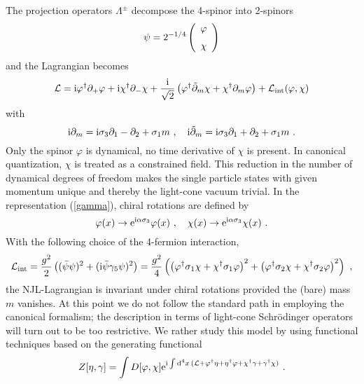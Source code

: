 \documentclass[a4paper,12pt]{article}
\begin{document}
The projection operators  $\Lambda^{\pm}$ decompose the 4-spinor into 2-spinors
\begin{displaymath}
\psi = 2^{-1/4}\left (\begin {array}{c} \varphi\\ \noalign{\medskip}\chi
\end {array}\right )
\end{displaymath}
and the Lagrangian becomes
\begin{equation}
  \label{lc4}
{\cal L} =
{\rm i}\varphi^{\dagger}\partial_{+}\varphi+{\rm i}\chi^{\dagger}\partial_{-}\chi+
\frac{{\rm i}}{\sqrt{2}}\left(\varphi^{\dagger}\tilde{\partial}_{m}\chi+\chi^{\dagger}
\partial_{m}\varphi\right)+{\cal L}_{\rm int}(\varphi,\chi)
\end{equation}
with
$$
{\rm i}\partial_{m}={\rm i}\sigma_{3}\partial_{1}-\partial_{2}+\sigma_{1}m\ , \quad {\rm i}
\tilde{\partial}_{m}={\rm i}\sigma_{3}\partial_{1}+\partial_{2}+\sigma_{1}m\ .$$
Only the spinor $\varphi$ is dynamical, no time derivative of $\chi$ is present. In canonical
quantization, $\chi$ is treated as a constrained field. This reduction in the number of dynamical
degrees of freedom makes the single particle states with given momentum unique and thereby the
light-cone vacuum trivial.
In the representation  (\ref{gamma}), chiral rotations are defined by
\begin{equation}
  \label{chirot}
  \varphi(x)\rightarrow {\rm e}^{{\rm i}\alpha \sigma_{3}}\varphi(x)\ ,\quad \chi(x)\rightarrow
{\rm e}^{{\rm i}\alpha \sigma_{3}}\chi(x)\ .
\end{equation}
With the following choice of the 4-fermion interaction,
\begin{equation}
 \label{ NJL}
 {\cal L}_{\rm int} = \frac{g^2}{2}\left((\bar{\psi}\psi)^{2} +({\rm i}\bar{\psi}\gamma_{5}
\psi)^2\right)
=\frac{g^2}{4}\left(\left(\varphi^{\dagger}\sigma_{1}\chi
  +\chi^{\dagger}\sigma_{1}\varphi\right)^2+\left(\varphi^{\dagger}\sigma_{2}\chi
  +\chi^{\dagger}\sigma_{2}\varphi\right)^2\right)\ ,
\end{equation}
the NJL-Lagrangian is invariant under chiral rotations provided  the (bare) mass $m$ vanishes.
At this point we do not follow the standard path in employing  the canonical formalism; the
description in terms of  light-cone  Schr\"odinger operators will turn out to be too restrictive.
We rather study this model by using functional techniques based on the generating functional
\begin{equation}
  \label{gefu}
  Z [ \eta,\gamma] = \int D [\varphi, \chi ]  {\rm e}^{{\rm  i} \int {\rm d}^4x\,({\cal L}+
\varphi^{\dagger} \eta + \eta^{\dagger} \varphi + \chi ^{\dagger} \gamma + \gamma^{\dagger} \chi ) }\ .
\end{equation}
\end{document}

